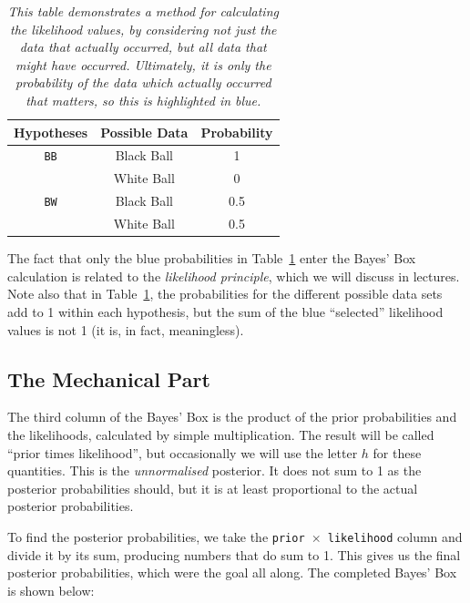 \begin{table}[ht!]
\begin{center}
\begin{tabular}{|c|c|c|}
\hline
{\bf Hypotheses} & {\bf Possible Data} & {\bf Probability} \\
\hline
{\tt BB} & {\color{blue} Black Ball} & {\color{blue} 1}\\
         & White Ball & 0 \\
\hline
{\tt BW} & {\color{blue} Black Ball} & {\color{blue} 0.5} \\
         & White Ball & 0.5 \\
\hline
\end{tabular}
\caption{\it This table demonstrates a method for calculating the likelihood
values, by considering not just the data that actually occurred, but all
data that might have occurred. Ultimately, it is only the probability of the
data which actually occurred that matters, so this is highlighted in blue.
\label{tab:all_data}}
\end{center}
\end{table}
The fact that only the blue probabilities in Table~\ref{tab:all_data} enter the
Bayes' Box calculation is related to the {\it likelihood principle}, which we
will
discuss in lectures. Note also that in Table~\ref{tab:all_data}, the
probabilities for the different possible data sets add to 1 within each
hypothesis, but the sum of the blue ``selected'' likelihood values is not 1
(it is, in fact, meaningless).

\subsection{The Mechanical Part}
The third column of the Bayes' Box is the product of the prior probabilities
and the likelihoods, calculated by simple multiplication. The result will be
called ``prior times likelihood'', but occasionally we will use the letter $h$
for these quantities. This is the {\it unnormalised} posterior. It does not sum
to 1 as the posterior probabilities should, but it is at least proportional to
the actual posterior probabilities.

To find the posterior probabilities, we take the {\tt prior $\times$ likelihood}
column and divide it by its sum, producing numbers that do sum to 1. This
gives us the final
posterior probabilities, which were the goal all along. The completed Bayes'
Box is shown below:


